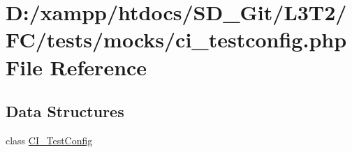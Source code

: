 \hypertarget{ci__testconfig_8php}{}\section{D\+:/xampp/htdocs/\+S\+D\+\_\+\+Git/\+L3\+T2/\+F\+C/tests/mocks/ci\+\_\+testconfig.php File Reference}
\label{ci__testconfig_8php}
\subsection*{Data Structures}
\begin{DoxyCompactItemize}
\item 
class \hyperlink{class_c_i___test_config}{C\+I\+\_\+\+Test\+Config}
\end{DoxyCompactItemize}
